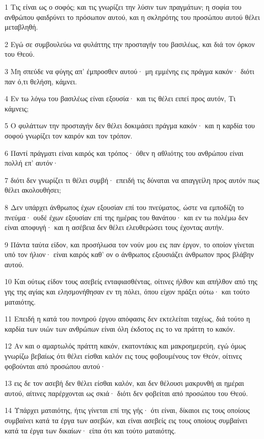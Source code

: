 \par 1 Τις είναι ως ο σοφός; και τις γνωρίζει την λύσιν των πραγμάτων; η σοφία του ανθρώπου φαιδρύνει το πρόσωπον αυτού, και η σκληρότης του προσώπου αυτού θέλει μεταβληθή.
\par 2 Εγώ σε συμβουλεύω να φυλάττης την προσταγήν του βασιλέως, και διά τον όρκον του Θεού.
\par 3 Μη σπεύδε να φύγης απ' έμπροσθεν αυτού· μη εμμένης εις πράγμα κακόν· διότι παν ό,τι θελήση, κάμνει.
\par 4 Εν τω λόγω του βασιλέως είναι εξουσία· και τις θέλει ειπεί προς αυτόν, Τι κάμνεις;
\par 5 Ο φυλάττων την προσταγήν δεν θέλει δοκιμάσει πράγμα κακόν· και η καρδία του σοφού γνωρίζει τον καιρόν και τον τρόπον.
\par 6 Παντί πράγματι είναι καιρός και τρόπος· όθεν η αθλιότης του ανθρώπου είναι πολλή επ' αυτόν·
\par 7 διότι δεν γνωρίζει τι θέλει συμβή· επειδή τις δύναται να απαγγείλη προς αυτόν πως θέλει ακολουθήσει;
\par 8 Δεν υπάρχει άνθρωπος έχων εξουσίαν επί του πνεύματος, ώστε να εμποδίζη το πνεύμα· ουδέ έχων εξουσίαν επί της ημέρας του θανάτου· και εν τω πολέμω δεν είναι αποφυγή· και η ασέβεια δεν θέλει ελευθερώσει τους έχοντας αυτήν.
\par 9 Πάντα ταύτα είδον, και προσήλωσα τον νούν μου εις παν έργον, το οποίον γίνεται υπό τον ήλιον· είναι καιρός καθ' ον ο άνθρωπος εξουσιάζει άνθρωπον προς βλάβην αυτού.
\par 10 Και ούτως είδον τους ασεβείς ενταφιασθέντας, οίτινες ήλθον και απήλθον από της γης της αγίας και ελησμονήθησαν εν τη πόλει, όπου είχον πράξει ούτω· και τούτο ματαιότης.
\par 11 Επειδή η κατά του πονηρού έργου απόφασις δεν εκτελείται ταχέως, διά τούτο η καρδία των υιών των ανθρώπων είναι όλη έκδοτος εις το να πράττη το κακόν.
\par 12 Αν και ο αμαρτωλός πράττη κακόν, εκατοντάκις και μακροημερεύη, εγώ όμως γνωρίζω βεβαίως ότι θέλει είσθαι καλόν εις τους φοβουμένους τον Θεόν, οίτινες φοβούνται από προσώπου αυτού·
\par 13 εις δε τον ασεβή δεν θέλει είσθαι καλόν, και δεν θέλουσι μακρυνθή αι ημέραι αυτού, αίτινες παρέρχονται ως σκιά· διότι δεν φοβείται από προσώπου του Θεού.
\par 14 Υπάρχει ματαιότης, ήτις γίνεται επί της γής· ότι είναι, δίκαιοι εις τους οποίους συμβαίνει κατά τα έργα των ασεβών, και είναι ασεβείς εις τους οποίους συμβαίνει κατά τα έργα των δικαίων· είπα ότι και τούτο ματαιότης.
